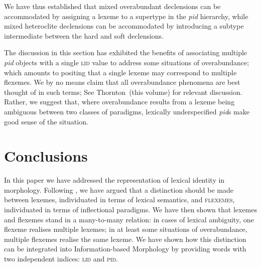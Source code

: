 \documentclass[output=paper]{langsci/langscibook}
\begin{document}
We have thus established that mixed overabundant declensions can be
accommodated by assigning a lexeme to a supertype in the \textit{pid}
hierarchy, while mixed heteroclite declensions can be accommodated by
introducing a subtype intermediate between the hard and soft
declensions.




 The discussion in this section has exhibited the benefits of
associating multiple \textit{pid} objects with a single \textsc{lid}
value to address some situations of overabundance; which amounts to
positing that a single lexeme may correspond to multiple flexemes.  We
by no means claim that all overabundance phenomena are best thought of
in such terms; See Thornton~(this volume) for relevant
discussion. Rather, we suggest that, where overabundance results from
a lexeme being ambiguous between two classes of paradigms, lexically
underspecified \textit{pid}s make good sense of the situation.



\section{Conclusions}


In this paper we have addressed the representation of lexical identity
in morphology. Following \citet{Fradin03b}, we have argued that a
distinction should be made between lexemes, individuated in terms of
lexical semantics, and \textsc{flexemes}, individuated in terms of
inflectional paradigms. We have then shown that lexemes and flexemes
stand in a many-to-many relation: in cases of lexical ambiguity, one
flexeme realises multiple lexemes; in at least some situations of
overabundance, multiple flexemes realise the same lexeme. We have
shown how this distinction can be integrated into Information-based
Morphology by providing words with two independent indices:
\textsc{lid} and \textsc{pid}.
\end{document}
